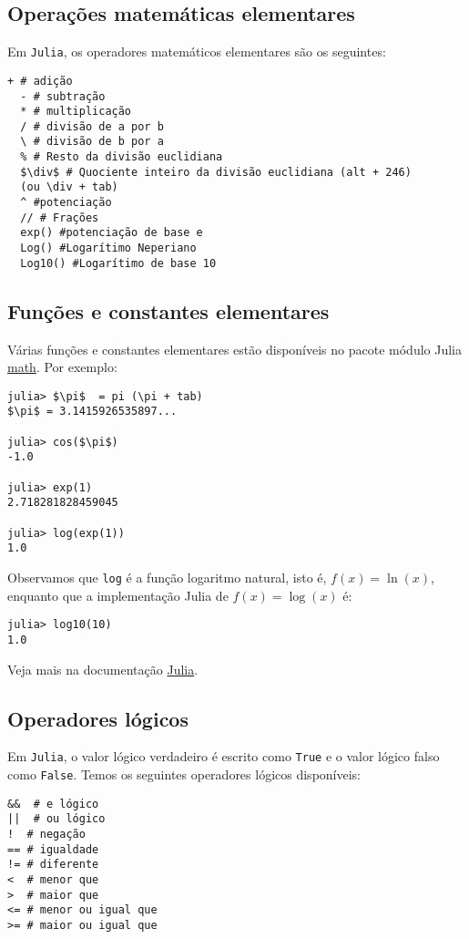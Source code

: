 \subsection{Operações matemáticas elementares}

Em \verb+Julia+, os operadores matemáticos elementares são os seguintes:
\begin{lstlisting}[mathescape=true]
  + # adição
  - # subtração
  * # multiplicação
  / # divisão de a por b
  \ # divisão de b por a
  % # Resto da divisão euclidiana
  $\div$ # Quociente inteiro da divisão euclidiana (alt + 246)
  (ou \div + tab)
  ^ #potenciação
  // # Frações
  exp() #potenciação de base e
  Log() #Logarítimo Neperiano
  Log10() #Logarítimo de base 10
\end{lstlisting}

\subsection{Funções e constantes elementares}

Várias funções e constantes elementares estão disponíveis no pacote módulo Julia \href{https://docs.Julia.org/3/library/math.html?highlight=math#module-math}{math}. Por exemplo:
\begin{lstlisting}[mathescape=true]
julia> $\pi$  = pi (\pi + tab)
$\pi$ = 3.1415926535897...

julia> cos($\pi$)
-1.0

julia> exp(1)
2.718281828459045

julia> log(exp(1))
1.0
\end{lstlisting}

Observamos que \verb+log+ é a função logaritmo natural, isto é, $f(x) = \ln(x)$, enquanto que a implementação Julia de $f(x) = \log(x)$ é:

\begin{lstlisting}
julia> log10(10)
1.0
\end{lstlisting}

Veja mais na documentação \href{https://julia-doc-pt-br.readthedocs.io/en/latest/manual/mathematical-operations.html}{Julia}.

\subsection{Operadores lógicos}

Em \verb+Julia+, o valor lógico verdadeiro é escrito como \verb+True+ e o valor lógico falso como \verb+False+. Temos os seguintes operadores lógicos disponíveis:
\begin{lstlisting}
&&  # e lógico
||  # ou lógico
!  # negação
== # igualdade
!= # diferente
<  # menor que
>  # maior que
<= # menor ou igual que
>= # maior ou igual que
\end{lstlisting}


